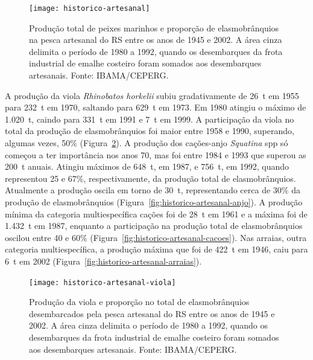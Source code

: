 \documentclass[a4paper,11pt,twoside,showtrims,onecolumn,openright,final]{memoir}
\begin{document}
\begin{figure}
\begin{center}
\texttt{[image: historico-artesanal]}
\end{center}
\caption[Produção total de peixes marinhos e proporção de elasmobrânquios 
         na pesca artesanal do RS entre os anos de 1945 e 2002]
        {Produção total de peixes marinhos e proporção de elasmobrânquios 
         na pesca artesanal do RS entre os anos de 1945 e 2002.
	 A área cinza delimita o período de 1980 a 1992, quando os 
	 desembarques da frota industrial de emalhe costeiro foram 
	 somados aos desembarques artesanais.
	 Fonte: IBAMA/CEPERG.}
\label{fig:historico-artesanal}
\end{figure}



A produção da viola \emph{Rhinobatos horkelii} subiu gradativamente de 26~t em 1955 
para 232~t em 1970, saltando para 629~t em 1973. Em 1980 atingiu o máximo de 1.020~t, 
caindo para 331~t em 1991 e 7~t em 1999. A participação da viola no total da produção 
de elasmobrânquios foi maior entre 1958 e 1990, superando, algumas vezes, 50\% (Figura~\ref{fig:historico-artesanal-viola}).
A produção dos cações-anjo \emph{Squatina} spp só começou a ter importância nos anos 70, 
mas foi entre 1984 e 1993 que superou as 200~t anuais. Atingiu máximos de 648~t, em 1987, 
e 756~t, em 1992, quando representou 25 e 67\%, respectivamente, da produção total de 
elasmobrânquios. Atualmente a produção oscila em torno de 30~t, representando cerca 
de 30\% da produção de elasmobrânquios (Figura~\ref{fig:historico-artesanal-anjo}). %
A produção mínima da categoria multiespecífica cações foi de 28~t em 1961 e a 
máxima foi de 1.432~t em 1987, enquanto a participação na produção total de 
elasmobrânquios oscilou entre 40 e 60\% (Figura~\ref{fig:historico-artesanal-cacoes}). %
Nas arraias, outra categoria multiespecífica, a produção máxima que foi 
de 422~t em 1946, caiu para 6~t em 2002 (Figura~\ref{fig:historico-artesanal-arraias}). %


\begin{figure}
\begin{center}
\texttt{[image: historico-artesanal-viola]}
\end{center}
\caption[Produção da viola e proporção no total de elasmobrânquios 
         desembarcados pela pesca artesanal do RS entre os anos de 1945 e 2002]
        {Produção da viola e proporção no total de elasmobrânquios 
         desembarcados pela pesca artesanal do RS entre os anos de 1945 e 2002.
	 A área cinza delimita o período de 1980 a 1992, quando os 
	 desembarques da frota industrial de emalhe costeiro foram 
	 somados aos desembarques artesanais.
	 Fonte: IBAMA/CEPERG.}
\label{fig:historico-artesanal-viola}	 
\end{figure}
\end{document}
